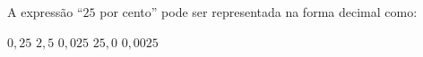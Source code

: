 A expressão ``$25$ por cento'' pode ser representada na forma decimal como:

$0{,}25$
$2{,}5$
$0{,}025$
$25{,}0$
$0{,}0025$



